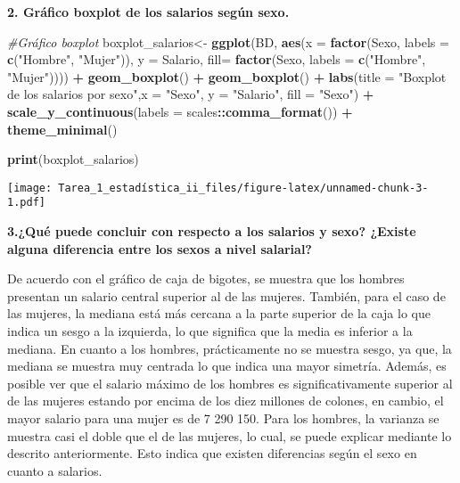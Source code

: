 \documentclass[
]{article}
\newenvironment{Shaded}{\begin{snugshade}}{\end{snugshade}}
\newcommand{\AttributeTok}[1]{\textcolor[rgb]{0.13,0.29,0.53}{#1}}
\newcommand{\CommentTok}[1]{\textcolor[rgb]{0.56,0.35,0.01}{\textit{#1}}}
\newcommand{\FunctionTok}[1]{\textcolor[rgb]{0.13,0.29,0.53}{\textbf{#1}}}
\newcommand{\NormalTok}[1]{#1}
\newcommand{\OtherTok}[1]{\textcolor[rgb]{0.56,0.35,0.01}{#1}}
\newcommand{\SpecialCharTok}[1]{\textcolor[rgb]{0.81,0.36,0.00}{\textbf{#1}}}
\newcommand{\StringTok}[1]{\textcolor[rgb]{0.31,0.60,0.02}{#1}}
\begin{document}
\textbf{2. Gráfico boxplot de los salarios según sexo.}

\begin{Shaded}
\begin{Highlighting}[]
\CommentTok{\#Gráfico boxplot}
\NormalTok{boxplot\_salarios}\OtherTok{\textless{}{-}} \FunctionTok{ggplot}\NormalTok{(BD, }\FunctionTok{aes}\NormalTok{(}\AttributeTok{x =} \FunctionTok{factor}\NormalTok{(Sexo, }\AttributeTok{labels =} \FunctionTok{c}\NormalTok{(}\StringTok{"Hombre"}\NormalTok{, }\StringTok{"Mujer"}\NormalTok{)), }\AttributeTok{y =}\NormalTok{ Salario, }\AttributeTok{fill=} \FunctionTok{factor}\NormalTok{(Sexo, }\AttributeTok{labels =} \FunctionTok{c}\NormalTok{(}\StringTok{"Hombre"}\NormalTok{, }\StringTok{"Mujer"}\NormalTok{)))) }\SpecialCharTok{+} 
  \FunctionTok{geom\_boxplot}\NormalTok{() }\SpecialCharTok{+} \FunctionTok{geom\_boxplot}\NormalTok{() }\SpecialCharTok{+}
  \FunctionTok{labs}\NormalTok{(}\AttributeTok{title =} \StringTok{"Boxplot de los salarios por sexo"}\NormalTok{,}\AttributeTok{x =} \StringTok{"Sexo"}\NormalTok{, }\AttributeTok{y =} \StringTok{"Salario"}\NormalTok{, }
       \AttributeTok{fill =} \StringTok{"Sexo"}\NormalTok{) }\SpecialCharTok{+} 
  \FunctionTok{scale\_y\_continuous}\NormalTok{(}\AttributeTok{labels =}\NormalTok{ scales}\SpecialCharTok{::}\FunctionTok{comma\_format}\NormalTok{()) }\SpecialCharTok{+}
  \FunctionTok{theme\_minimal}\NormalTok{()}

\FunctionTok{print}\NormalTok{(boxplot\_salarios)}
\end{Highlighting}
\end{Shaded}

\texttt{[image: Tarea\_1\_estadística\_ii\_files/figure-latex/unnamed-chunk-3-1.pdf]}

\textbf{3.¿Qué puede concluir con respecto a los salarios y sexo?
¿Existe alguna diferencia entre los sexos a nivel salarial?}

De acuerdo con el gráfico de caja de bigotes, se muestra que los hombres
presentan un salario central superior al de las mujeres. También, para
el caso de las mujeres, la mediana está más cercana a la parte superior
de la caja lo que indica un sesgo a la izquierda, lo que significa que
la media es inferior a la mediana. En cuanto a los hombres,
prácticamente no se muestra sesgo, ya que, la mediana se muestra muy
centrada lo que indica una mayor simetría. Además, es posible ver que el
salario máximo de los hombres es significativamente superior al de las
mujeres estando por encima de los diez millones de colones, en cambio,
el mayor salario para una mujer es de 7 290 150. Para los hombres, la
varianza se muestra casi el doble que el de las mujeres, lo cual, se
puede explicar mediante lo descrito anteriormente. Esto indica que
existen diferencias según el sexo en cuanto a salarios.
\end{document}
